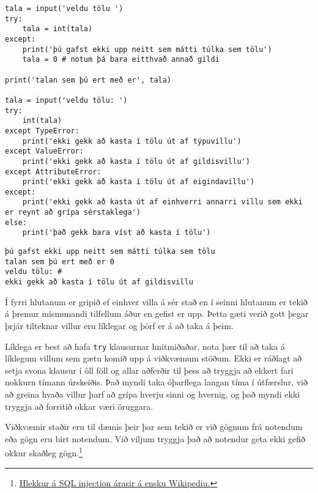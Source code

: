 \begin{lstlisting}[caption=Hvernig á að beita try\, except og else, label=lst:villur-grip-kynnt]
tala = input('veldu tölu ')
try:
	tala = int(tala)
except:
	print('þú gafst ekki upp neitt sem mátti túlka sem tölu')
	tala = 0 # notum þá bara eitthvað annað gildi
	
print('talan sem þú ert með er', tala)

tala = input('veldu tölu: ')
try:
	int(tala)
except TypeError:
	print('ekki gekk að kasta í tölu út af týpuvillu')
except ValueError:
	print('ekki gekk að kasta í tölu út af gildisvillu')
except AttributeError:
	print('ekki gekk að kasta í tölu út af eigindavillu')
except:
	print('ekki gekk að kasta út af einhverri annarri villu sem ekki er reynt að grípa sérstaklega')
else:
	print('það gekk bara víst að kasta í tölu')
\end{lstlisting}
\lstset{style=uttak}
\begin{lstlisting}
þú gafst ekki upp neitt sem mátti túlka sem tölu
talan sem þú ert með er 0
veldu tölu: #
ekki gekk að kasta í tölu út af gildisvillu
\end{lstlisting}
\lstset{style=venjulegt}

Í fyrri hlutanum er gripið ef einhver villa á sér stað en í seinni hlutanum er tekið á þremur mismunandi tilfellum áður en gefist er upp.
Þetta gæti verið gott þegar þrjár tilteknar villur eru líklegar og þörf er á að taka á þeim.

Líklega er best að hafa \texttt{try} klausurnar hnitmiðaðar, nota þær til að taka á líklegum villum sem gætu komið upp á viðkvæmum stöðum.
Ekki er ráðlagt að setja svona klausur í öll föll og allar aðferðir til þess að tryggja að ekkert fari nokkurn tímann úrskeiðis.
Það myndi taka óþarflega langan tíma í útfærslur, við að greina hvaða villur þarf að grípa hverju sinni og hvernig, og það myndi ekki tryggja að forritið okkar væri öruggara.

Viðkvæmir staðir eru til dæmis þeir þar sem tekið er við gögnum frá notendum eða gögn eru birt notendum.
Við viljum tryggja það að notendur geta ekki gefið okkur skaðleg gögn.\footnote{\href{https://en.wikipedia.org/wiki/SQL_injection}{Hlekkur á SQL injection árasir á ensku Wikipediu.}}

